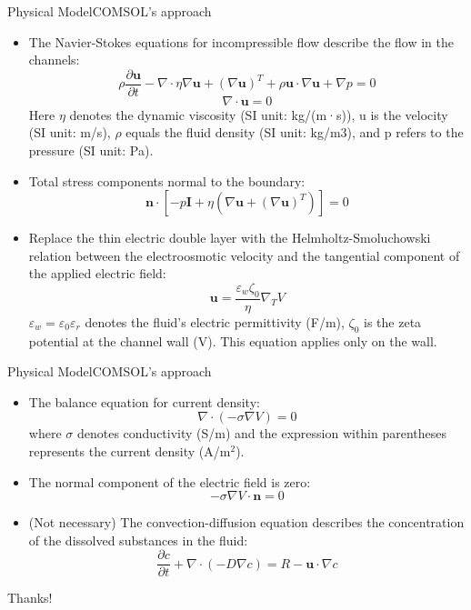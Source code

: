 \documentclass[10pt]{beamer}
\begin{document}
\begin{frame}{Physical Model}{COMSOL's approach}
    \begin{itemize}
        \item The Navier-Stokes equations for incompressible flow describe the flow in the channels:
              \[\rho\frac{\partial\bm{u}}{\partial t}-\nabla\cdot\eta\nabla\bm{u}+(\nabla\bm{u})^T+\rho\bm{u}\cdot\nabla\bm{u}+\nabla p=0\]
              \[\nabla\cdot\bm{u}=0\]
              Here $\eta$ denotes the dynamic viscosity (SI unit: kg/(m·s)), u is the velocity (SI unit: m/s), $\rho$ equals the fluid density (SI unit: kg/m3), and p refers to the pressure (SI unit: Pa).
        \item Total stress components normal to the boundary:
              \[\bm{n}\cdot[-p\bm{I}+\eta(\nabla\bm{u}+(\nabla\bm{u})^T)]=0\]
        \item Replace the thin electric double layer with the Helmholtz-Smoluchowski relation between the electroosmotic velocity and the tangential component of the applied electric field:
              \[\bm{u}=\frac{\varepsilon_w\zeta_0}{\eta}\nabla_TV\]
              $\varepsilon_w=\varepsilon_0\varepsilon_r$ denotes the fluid’s electric permittivity (F/m), $\zeta_0$ is the zeta potential at the channel wall (V). This equation applies only on the wall.
    \end{itemize}
\end{frame}
\begin{frame}{Physical Model}{COMSOL's approach}
    \begin{itemize}
        \item The balance equation for current density:
              \[\nabla\cdot(-\sigma\nabla V)=0\]
              where $\sigma$ denotes conductivity (S/m) and the expression within parentheses represents the current density (A/m$^2$).
        \item The normal component of the electric field is zero:
              \[-\sigma\nabla V\cdot\bm{n}=0\]
        \item (Not necessary) The convection-diffusion equation describes the concentration of the dissolved substances in the fluid:
              \[\frac{\partial c}{\partial t}+\nabla\cdot(-D\nabla c)=R-\bm{u}\cdot\nabla c\]
    \end{itemize}
\end{frame}
\begin{frame}
    \begin{center}
        Thanks!
    \end{center}
\end{frame}
\end{document}
